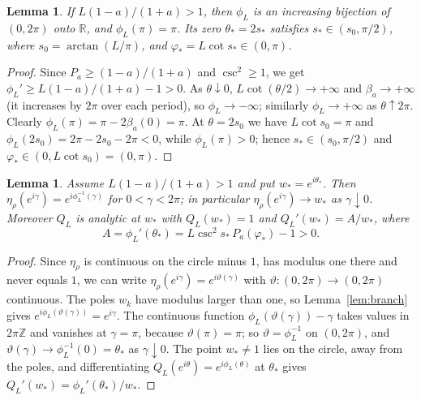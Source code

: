 \documentclass[11pt]{amsart}
\newtheorem{lemma}[theorem]{Lemma}
\theoremstyle{remark}
\newcommand{\R}{\mathbb R}
\newcommand{\Z}{\mathbb Z}
\begin{document}
\begin{lemma}\label{lem:phase}
If $L(1-a)/(1+a)>1$, then $\phi_L$ is an increasing bijection of $(0,2\pi)$ onto $\R$, and $\phi_L(\pi)=\pi$. Its zero $\theta_*=2s_*$ satisfies $s_*\in(s_0,\pi/2)$, where $s_0=\arctan(L/\pi)$, and $\varphi_*=L\cot s_*\in(0,\pi)$.
\end{lemma}

\begin{proof}
Since $P_a\ge(1-a)/(1+a)$ and $\csc^2\ge1$, we get $\phi_L'\ge L(1-a)/(1+a)-1>0$. As $\theta\downarrow0$, $L\cot(\theta/2)\to+\infty$ and $\beta_a\to+\infty$ (it increases by $2\pi$ over each period), so $\phi_L\to-\infty$; similarly $\phi_L\to+\infty$ as $\theta\uparrow2\pi$. Clearly $\phi_L(\pi)=\pi-2\beta_a(0)=\pi$. At $\theta=2s_0$ we have $L\cot s_0=\pi$ and $\phi_L(2s_0)=2\pi-2s_0-2\pi<0$, while $\phi_L(\pi)>0$; hence $s_*\in(s_0,\pi/2)$ and $\varphi_*\in(0,L\cot s_0)=(0,\pi)$.
\end{proof}

\begin{lemma}\label{lem:boundary}
Assume $L(1-a)/(1+a)>1$ and put $w_*=e^{i\theta_*}$. Then $\eta_\rho(e^{i\gamma})=e^{i\phi_L^{-1}(\gamma)}$ for $0<\gamma<2\pi$; in particular $\eta_\rho(e^{i\gamma})\to w_*$ as $\gamma\downarrow0$. Moreover $Q_L$ is analytic at $w_*$ with $Q_L(w_*)=1$ and $Q_L'(w_*)=A/w_*$, where
\[
A=\phi_L'(\theta_*)=L\csc^2 s_*\,P_a(\varphi_*)-1>0 .
\]
\end{lemma}

\begin{proof}
Since $\eta_\rho$ is continuous on the circle minus $1$, has modulus one there and never equals $1$, we can write $\eta_\rho(e^{i\gamma})=e^{i\vartheta(\gamma)}$ with $\vartheta:(0,2\pi)\to(0,2\pi)$ continuous. The poles $w_k$ have modulus larger than one, so Lemma~\ref{lem:branch} gives $e^{i\phi_L(\vartheta(\gamma))}=e^{i\gamma}$. The continuous function $\phi_L(\vartheta(\gamma))-\gamma$ takes values in $2\pi\Z$ and vanishes at $\gamma=\pi$, because $\vartheta(\pi)=\pi$; so $\vartheta=\phi_L^{-1}$ on $(0,2\pi)$, and $\vartheta(\gamma)\to\phi_L^{-1}(0)=\theta_*$ as $\gamma\downarrow0$. The point $w_*\ne1$ lies on the circle, away from the poles, and differentiating $Q_L(e^{i\theta})=e^{i\phi_L(\theta)}$ at $\theta_*$ gives $Q_L'(w_*)=\phi_L'(\theta_*)/w_*$.
\end{proof}
\end{document}
